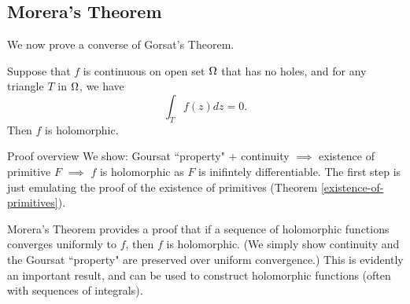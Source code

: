 \subsection{Morera's Theorem}
We now prove a converse of Gorsat's Theorem.
\begin{thm}
    Suppose that $f$ is continuous on open set $\Omega$ that has no holes, and for any triangle $T$ in $\Omega$, we have
    \[
        \int_T f(z) dz = 0.
    \]
    Then $f$ is holomorphic.
\end{thm}
\begin{details}{Proof overview}
    We show: Goursat ``property" + continuity $\implies$ existence of primitive $F$ $\implies$ $f$ is holomorphic as $F$ is inifintely differentiable. The first step is just emulating the proof of the existence of primitives (Theorem \ref{existence-of-primitives}).
\end{details}
Morera's Theorem provides a proof that if a sequence of holomorphic functions converges uniformly to $f$, then $f$ is holomorphic. (We simply show continuity and the Goursat ``property" are preserved over uniform convergence.) This is evidently an important result, and can be used to construct holomorphic functions (often with sequences of integrals).
